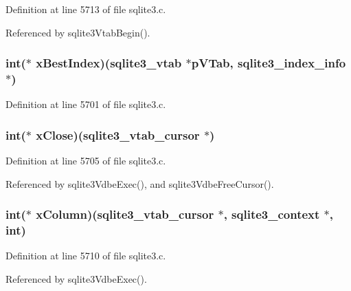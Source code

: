 Definition at line 5713 of file sqlite3.\+c.



Referenced by sqlite3\+Vtab\+Begin().

\hypertarget{structsqlite3__module_af634165424ffccb1ef5dab5ff650eb99}{}
\subsubsection[{x\+Best\+Index}]{\setlength{\rightskip}{0pt plus 5cm}int($\ast$ x\+Best\+Index)({\bf sqlite3\+\_\+vtab} $\ast$p\+V\+Tab, {\bf sqlite3\+\_\+index\+\_\+info} $\ast$)}\label{structsqlite3__module_af634165424ffccb1ef5dab5ff650eb99}


Definition at line 5701 of file sqlite3.\+c.

\hypertarget{structsqlite3__module_a23c31c84107f2703d3d5103f14c76ed8}{}
\subsubsection[{x\+Close}]{\setlength{\rightskip}{0pt plus 5cm}int($\ast$ x\+Close)({\bf sqlite3\+\_\+vtab\+\_\+cursor} $\ast$)}\label{structsqlite3__module_a23c31c84107f2703d3d5103f14c76ed8}


Definition at line 5705 of file sqlite3.\+c.



Referenced by sqlite3\+Vdbe\+Exec(), and sqlite3\+Vdbe\+Free\+Cursor().

\hypertarget{structsqlite3__module_a68814ced7e2d7eb49c141d82ac2367a1}{}
\subsubsection[{x\+Column}]{\setlength{\rightskip}{0pt plus 5cm}int($\ast$ x\+Column)({\bf sqlite3\+\_\+vtab\+\_\+cursor} $\ast$, {\bf sqlite3\+\_\+context} $\ast$, int)}\label{structsqlite3__module_a68814ced7e2d7eb49c141d82ac2367a1}


Definition at line 5710 of file sqlite3.\+c.



Referenced by sqlite3\+Vdbe\+Exec().


